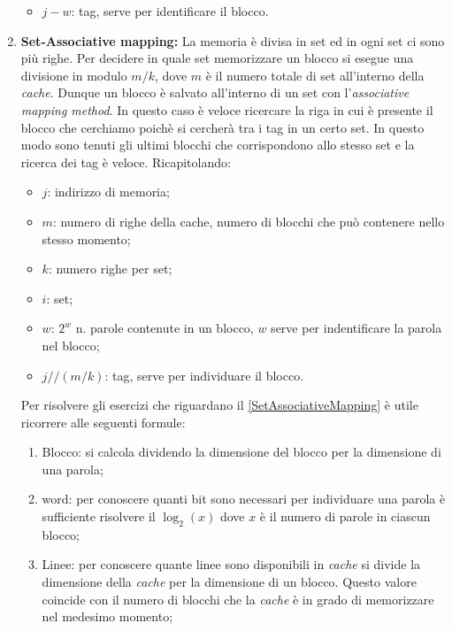\documentclass{article}
\begin{document}
\begin{enumerate}
\begin{itemize}
		\item $j-w$: tag, serve per identificare il blocco.

	\end{itemize}

	\item \label{SetAssociativeMapping} \textbf{Set-Associative mapping:}
	La memoria è divisa in set ed in ogni set ci sono più righe. Per decidere in quale set memorizzare un blocco si esegue una divisione in modulo $m/k$, dove $m$ è il numero totale di set all'interno della \textit{cache}. Dunque un blocco è salvato all'interno di un set con l'\textit{associative mapping method}. In questo caso è veloce ricercare la riga in cui è presente il blocco che cerchiamo poichè si cercherà tra i tag in un certo set. In questo modo sono tenuti gli ultimi blocchi che corrispondono allo stesso set e la ricerca dei tag è veloce. Ricapitolando:
	\begin{itemize}
		\item $j$: indirizzo di memoria;

		\item $m$: numero di righe della cache, numero di blocchi che può contenere nello stesso momento;

		\item $k$: numero righe per set;

		\item $i$: set;

		\item $w$: $2^w$ n. parole contenute in un blocco, $w$ serve per indentificare la parola nel blocco;

		\item $j//(m/k)$: tag, serve per individuare il blocco.
	\end{itemize}

Per risolvere gli esercizi che riguardano il \ref{SetAssociativeMapping} è utile ricorrere alle seguenti formule:
\begin{enumerate}
  \item Blocco: si calcola dividendo la dimensione del blocco per la dimensione di una parola;

  \item word: per conoscere quanti bit sono necessari per individuare una parola è sufficiente risolvere il $\log_2(x)$ dove $x$ è il numero di parole in ciascun blocco;

  \item Linee: per conoscere quante linee sono disponibili in \textit{cache} si divide la dimensione della \textit{cache} per la dimensione di un blocco. Questo valore coincide con il numero di blocchi che la \textit{cache} è in grado di memorizzare nel medesimo momento;


\end{enumerate}
\end{enumerate}
\end{document}

